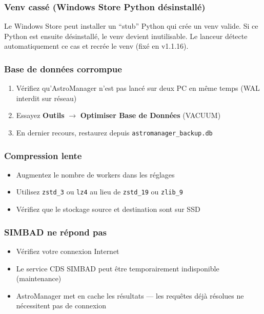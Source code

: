 \documentclass[a4paper,11pt]{article}
\begin{document}
\subsubsection{Venv cass\'{e} (Windows Store Python d\'{e}sinstall\'{e})}

Le Windows Store peut installer un ``stub'' Python qui cr\'{e}e un venv valide. Si ce Python est ensuite d\'{e}sinstall\'{e}, le venv devient inutilisable. Le lanceur d\'{e}tecte automatiquement ce cas et recr\'{e}e le venv (fix\'{e} en v1.1.16).

\subsubsection{Base de donn\'{e}es corrompue}

\begin{enumerate}
    \item V\'{e}rifiez qu'AstroManager n'est pas lanc\'{e} sur deux PC en m\^{e}me temps (WAL interdit sur r\'{e}seau)
    \item Essayez \textbf{Outils} $\rightarrow$ \textbf{Optimiser Base de Donn\'{e}es} (VACUUM)
    \item En dernier recours, restaurez depuis \texttt{astromanager\_backup.db}
\end{enumerate}

\subsubsection{Compression lente}

\begin{itemize}
    \item Augmentez le nombre de workers dans les r\'{e}glages
    \item Utilisez \texttt{zstd\_3} ou \texttt{lz4} au lieu de \texttt{zstd\_19} ou \texttt{zlib\_9}
    \item V\'{e}rifiez que le stockage source et destination sont sur SSD
\end{itemize}

\subsubsection{SIMBAD ne r\'{e}pond pas}

\begin{itemize}
    \item V\'{e}rifiez votre connexion Internet
    \item Le service CDS SIMBAD peut \^{e}tre temporairement indisponible (maintenance)
    \item AstroManager met en cache les r\'{e}sultats --- les requ\^{e}tes d\'{e}j\`{a} r\'{e}solues ne n\'{e}cessitent pas de connexion
\end{itemize}
\end{document}
